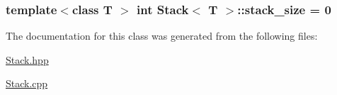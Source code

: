 \subsubsection[{\texorpdfstring{stack\+\_\+size}{stack_size}}]{\setlength{\rightskip}{0pt plus 5cm}template$<$class T $>$ int {\bf Stack}$<$ T $>$\+::stack\+\_\+size = 0\hspace{0.3cm}{\ttfamily [private]}}\hypertarget{class_stack_a1a9e981b54a1f437580c5fccdbaae1fa}{}\label{class_stack_a1a9e981b54a1f437580c5fccdbaae1fa}


The documentation for this class was generated from the following files\+:\begin{DoxyCompactItemize}
\item 
\hyperlink{_stack_8hpp}{Stack.\+hpp}\item 
\hyperlink{_stack_8cpp}{Stack.\+cpp}\end{DoxyCompactItemize}
